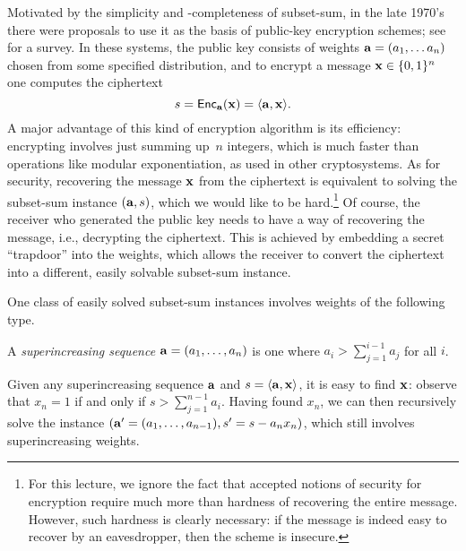 \documentclass[11pt]{article}
\begin{document}
Motivated by the simplicity and \NP-completeness of subset-sum, in the
late 1970's there were proposals to use it as the basis of public-key
encryption schemes; see~\cite{odlyzko90:_rise_and_fall_of_knaps_crypt}
for a survey. In these systems, the public key consists of weights
$\mathbf{a}=(a_1, \ldots a_{n})$ chosen from some specified distribution,
and to encrypt a message $\mathbf{x} \in \{0,1\}^{n}$ one computes the
ciphertext
\[ s = \mathsf{Enc}_{\mathbf{a}}(\mathbf{x}) = \langle\mathbf{a}, \mathbf{x}\rangle. \] A major
advantage of this kind of encryption algorithm is its efficiency:
encrypting involves just summing up~$n$ integers, which is much faster
than operations like modular exponentiation, as used in other
cryptosystems. As for security, recovering the message $\mathbf{x}$ from
the ciphertext is equivalent to solving the subset-sum instance
$(\mathbf{a}, s)$, which we would like to be hard.\footnote{For this
  lecture, we ignore the fact that accepted notions of security for
  encryption require much more than hardness of recovering the entire
  message. However, such hardness is clearly necessary: if the message
  is indeed easy to recover by an eavesdropper, then the scheme is
  insecure.} Of course, the receiver who generated the public key
needs to have a way of recovering the message, i.e., decrypting the
ciphertext. This is achieved by embedding a secret ``trapdoor'' into
the weights, which allows the receiver to convert the ciphertext into
a different, easily solvable subset-sum instance.

One class of easily solved subset-sum instances involves weights of
the following type.
\begin{definition}
  \label{def:superincreasing}
  A \emph{superincreasing sequence} $\mathbf{a}=(a_{1}, \ldots, a_{n})$ is
  one where $a_i > \sum_{j=1}^{i-1} a_j$ for all $i$.
\end{definition}
Given any superincreasing sequence $\mathbf{a}$ and $s=\langle\mathbf{a},
  \mathbf{x}\rangle$, it is easy to find $\mathbf{x}$: observe that $x_{n} = 1$ if and
only if $s > \sum_{j=1}^{n-1} a_{i}$.  Having found $x_{n}$, we can
then recursively solve the instance $(\mathbf{a}' = (a_{1}, \ldots,
a_{n-1}), s' = s - a_{n} x_{n})$, which still involves superincreasing
weights.
\end{document}
